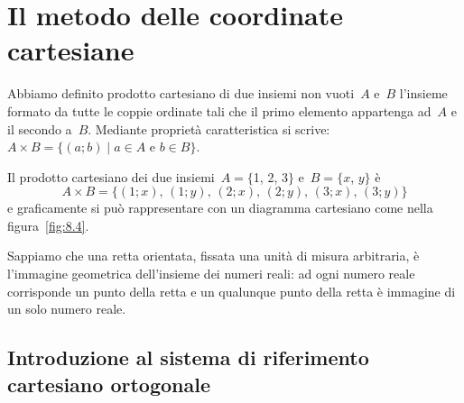 
\vspazio\ovalbox{\risolvii \ref{ese:8.17}, \ref{ese:8.18}, \ref{ese:8.19}}

\section{Il metodo delle coordinate cartesiane}\label{sect:coordinate_cartesiane}

Abbiamo definito prodotto cartesiano di due insiemi non vuoti~$A$ e~$B$ l'insieme formato da tutte
le coppie ordinate tali che il primo elemento appartenga ad~$A$ e il secondo a~$B$. Mediante proprietà caratteristica
si scrive:~$A\times B=\{(a;b)\mid a\in A\text{ e }b\in B\}$.
\pagebreak
\begin{exrig}
 \begin{esempio}
 \label{ex:8.11}
Il prodotto cartesiano dei due insiemi~$A=\{$1, 2, 3$\}$ e~$B=\{x$, $y\}$ è
\[A \times B = \{(1;x)\text{, }(1;y)\text{, }(2;x)\text{, }(2;y)\text{, }(3;x)\text{, }(3;y)\}\]
e graficamente si può rappresentare con un diagramma cartesiano come nella figura~\ref{fig:8.4}.

Sappiamo che una retta orientata, fissata una unità di misura arbitraria, è l'immagine geometrica dell'insieme dei numeri reali:
ad ogni numero reale corrisponde un punto della retta e un qualunque punto della retta è immagine di un solo numero reale.
 \end{esempio}
\end{exrig}

\subsection{Introduzione al sistema di riferimento cartesiano ortogonale}

